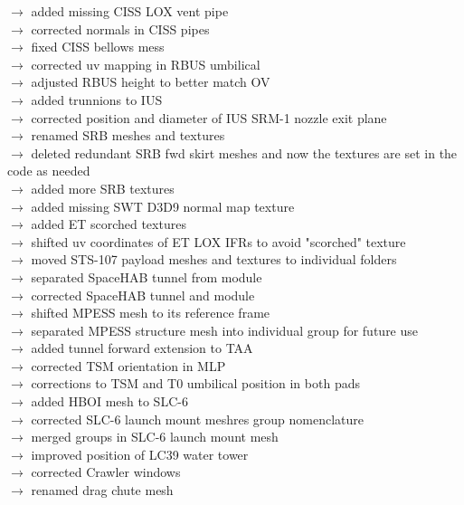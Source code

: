 \documentclass[Space_Shuttle_Vessel_Manual.tex]{subfiles}
\begin{document}
$\rightarrow$ added missing CISS LOX vent pipe\\
$\rightarrow$ corrected normals in CISS pipes\\
$\rightarrow$ fixed CISS bellows mess\\
$\rightarrow$ corrected uv mapping in RBUS umbilical\\
$\rightarrow$ adjusted RBUS height to better match OV\\
$\rightarrow$ added trunnions to IUS\\
$\rightarrow$ corrected position and diameter of IUS SRM-1 nozzle exit plane\\
$\rightarrow$ renamed SRB meshes and textures\\
$\rightarrow$ deleted redundant SRB fwd skirt meshes and now the textures are set in the code as needed\\
$\rightarrow$ added more SRB textures\\
$\rightarrow$ added missing SWT D3D9 normal map texture\\
$\rightarrow$ added ET scorched textures\\
$\rightarrow$ shifted uv coordinates of ET LOX IFRs to avoid "scorched" texture\\
$\rightarrow$ moved STS-107 payload meshes and textures to individual folders\\
$\rightarrow$ separated SpaceHAB tunnel from module\\
$\rightarrow$ corrected SpaceHAB tunnel and module\\
$\rightarrow$ shifted MPESS mesh to its reference frame\\
$\rightarrow$ separated MPESS structure mesh into individual group for future use\\
$\rightarrow$ added tunnel forward extension to TAA\\
$\rightarrow$ corrected TSM orientation in MLP\\
$\rightarrow$ corrections to TSM and T0 umbilical position in both pads\\
$\rightarrow$ added HBOI mesh to SLC-6\\
$\rightarrow$ corrected SLC-6 launch mount meshres group nomenclature\\
$\rightarrow$ merged groups in SLC-6 launch mount mesh\\
$\rightarrow$ improved position of LC39 water tower\\
$\rightarrow$ corrected Crawler windows\\
$\rightarrow$ renamed drag chute mesh\\
\end{document}
